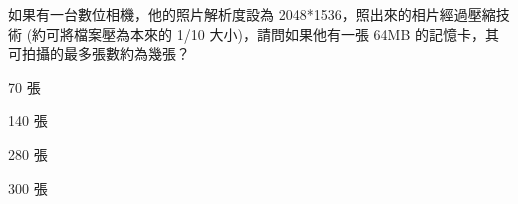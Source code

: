 \ifx\ntpcNinetyTwo\undefined[92學年基北區] \fi
如果有一台數位相機，他的照片解析度設為 2048*1536，照出來的相片經過壓縮技術 (約可將檔案壓為本來的 1/10 大小)，請問如果他有一張 64MB 的記憶卡，其可拍攝的最多張數約為幾張？
  \begin{optionlist}
  \item 70 張\label{ntpc-92-a28}
  \item 140 張
  \item 280 張
  \item 300 張
  \end{optionlist}